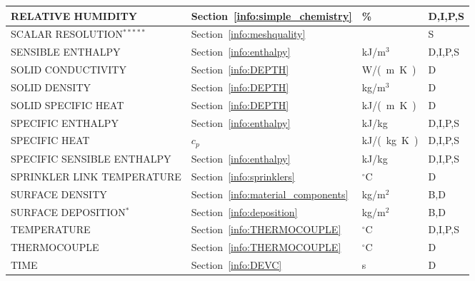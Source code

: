 \documentclass[11pt]{book}
\begin{document}
\begin{longtable}{@{\extracolsep{\fill}}|l|l|l|l|}
{\ct RELATIVE HUMIDITY}                         & Section~\ref{info:simple_chemistry}           & \%             & D,I,P,S      \\ \hline
{\ct SCALAR RESOLUTION}$^{*****}$               & Section~\ref{info:meshquality}                &                & S            \\ \hline
{\ct SENSIBLE ENTHALPY}                         & Section~\ref{info:enthalpy}                   & kJ/m$^3$       & D,I,P,S      \\ \hline
{\ct SOLID CONDUCTIVITY}                        & Section~\ref{info:DEPTH}                      & \si{W/(m.K)}   & D            \\ \hline
{\ct SOLID DENSITY}                             & Section~\ref{info:DEPTH}                      & kg/m$^3$       & D            \\ \hline
{\ct SOLID SPECIFIC HEAT}                       & Section~\ref{info:DEPTH}                      & \si{kJ/(m.K)}  & D            \\ \hline
{\ct SPECIFIC ENTHALPY}                         & Section~\ref{info:enthalpy}                   & kJ/kg          & D,I,P,S      \\ \hline
{\ct SPECIFIC HEAT}                             & $c_p$                                         & \si{kJ/(kg.K)} & D,I,P,S      \\ \hline
{\ct SPECIFIC SENSIBLE ENTHALPY}                & Section~\ref{info:enthalpy}                   & kJ/kg          & D,I,P,S      \\ \hline
{\ct SPRINKLER LINK TEMPERATURE}                & Section~\ref{info:sprinklers}                 & $^\circ$C      & D            \\ \hline
{\ct SURFACE DENSITY}                           & Section~\ref{info:material_components}        & kg/m$^2$       & B,D          \\ \hline
{\ct SURFACE DEPOSITION}$^*$                    & Section~\ref{info:deposition}                 & kg/m$^2$       & B,D          \\ \hline
{\ct TEMPERATURE}                               & Section~\ref{info:THERMOCOUPLE}               & $^\circ$C      & D,I,P,S      \\ \hline
{\ct THERMOCOUPLE}                              & Section~\ref{info:THERMOCOUPLE}               & $^\circ$C      & D            \\ \hline
{\ct TIME}                                      & Section~\ref{info:DEVC}                       & s              & D            \\ \hline

\end{longtable}
\end{document}
